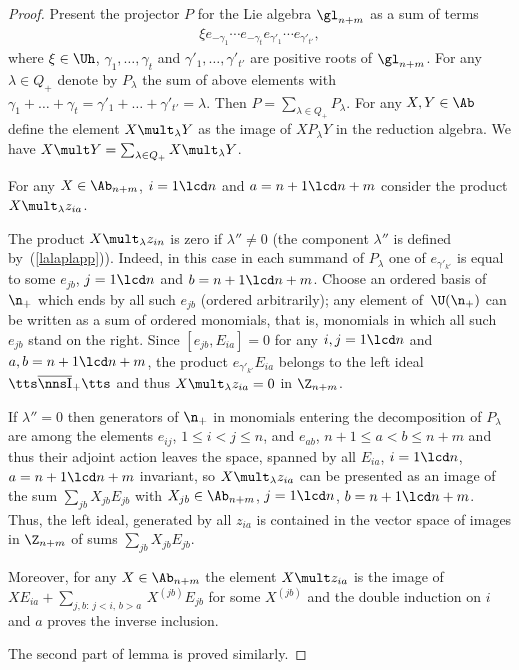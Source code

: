 \documentclass[11pt]{article}
\def\Ib{\tts\overline{\nns\rm I}_+\tts}\def\J{\mathrm{J}}\def\Jb{\,\overline{\!\rm I}_-\ts}\def\k{\mathfrak{k}}
\def\nplus{\mathfrak{n}}\def\nn{\nonumber}\def\nin{\noindent}
\def\s{z}\def\S{\mathrm {S}}\def\si{\sigma}\def\Sp{\S^{\nplus}}\def\sy{\acute{\sigma}}\def\th{\mathring{h}}
\numberwithin{equation}{section}
\begin{document}
\begin{proof}
Present the projector $P$ for the Lie algebra $\gl_{n+m}$ as a sum of terms
\begin{gather}
\label{wedeopro} \xi e_{-\gamma_1}\cdots e_{-\gamma_t}e_{\gamma'_{1}}\cdots e_{\gamma'_{t'}}  ,
\end{gather}
where $\xi\in\Uh$, $\gamma_1,\dots ,\gamma_t$ and $\gamma'_1,\dots ,\gamma'_{t'}$ are positive roots of $\gl_{n+m}$. For any $\lambda\in Q_+$
 denote by $P_\lambda$  the sum of above elements with $\gamma_1+\dots +\gamma_{t}=
\gamma'_1+\dots +\gamma'_{t'}=\lambda$. Then $P=\sum_{\lambda\in Q_+}P_\lambda$.
{} For any $X,Y\in\Ab$ def\/ine the element  $X\mult_\lambda Y$ as the image of $XP_\lambda Y$ in the reduction algebra. We have
$X\mult Y=\sum_{\lambda\in Q_+} X\mult_\lambda Y$.


For any $X\in\Ab_{n+m}$, $i=1\lcd n$ and $a=n+1\lcd n+m$ consider the product $X\mult_\lambda \s_{ia}$.


The product $X\mult_\lambda \s_{in}$ is zero if $\lambda''\not=0$ (the component $\lambda''$ is def\/ined by~(\ref{lalaplapp})).
Indeed, in this case in each summand of $P_\lambda$ one of $e_{\gamma'_{k'}}$ is equal to some $e_{jb}$, $j=1\lcd n$ and $b= n+1\lcd n+m$.
Choose an ordered basis of $\n_+$ which ends by all such $e_{jb}$ (ordered arbitrarily);
any element of~$\U(\n_+)$ can be written as a sum of ordered monomials, that is, monomials in which all such~$e_{jb}$ stand on the right.
Since $[e_{jb},E_{ia}]=0$ for any $i,j=1\lcd n$ and $a,b=n+1\lcd n+m$, the product
$e_{\gamma'_{k'}}E_{ia}$ belongs to the left ideal $\Ib$ and thus $X\mult_\lambda \s_{ia}=0$ in $\Z_{n+m}$.


If $\lambda''=0$ then generators of $\n_+$ in monomials entering the decomposition of  $P_\lambda$ are among the elements $e_{ij}$,
$1\leq i<j\leq n$, and $e_{ab}$, $n+1\leq a<b\leq n+m$ and thus their adjoint action leaves the space, spanned by all $E_{ia}$, $i=1\lcd n$,
$a=n+1\lcd n+m$ invariant, so $X\mult_\lambda \s_{ia}$ can be  presented as an image of the sum $\sum_{jb}X_{jb} E_{jb}$ with $X_{jb}\in\Ab_{n+m}$,
$j=1\lcd n$, $b=n+1\lcd n+m$. Thus, the left ideal, generated by all $\s_{ia}$ is contained in the vector space of images in $\Z_{n+m}$ of  sums
$\sum_{jb}X_{jb} E_{jb}$.


Moreover, for any $X\in\Ab_{n+m}$ the element $X\mult \s_{ia}$ is the image of $XE_{ia}+\sum_{j,b:\, j<i,\, b>a}\, X^{(jb)}E_{jb}$ for some $X^{(jb)}$
and the double induction on $i$ and $a$ proves the inverse inclusion.


The second part of lemma is proved similarly.
\end{proof}
\end{document}
